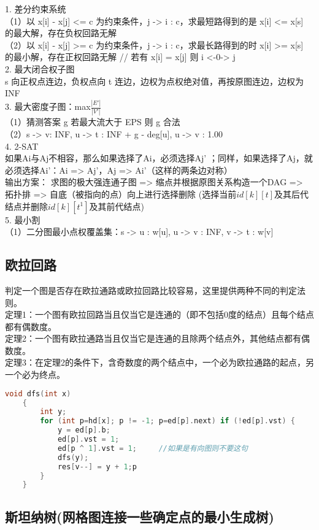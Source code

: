 \documentclass[landscape,a4paper]{article}
\begin{document}
\begin{spacing}{0.3}
\begin{multicols}{2}
		1. 差分约束系统\\
  （1）以 x[i] - x[j] <= c 为约束条件，j -> i : c，求最短路得到的是 x[i] <= x[s] 的最大解，存在负权回路无解\\
  （2）以 x[i] - x[j] >= c 为约束条件，j -> i : c，求最长路得到的时 x[i] >= x[s] 的最小解，存在正权回路无解
  // 若有 x[i] = x[j] 则 i <-0-> j\\
2. 最大闭合权子图\\
  s 向正权点连边，负权点向 t 连边，边权为点权绝对值，再按原图连边，边权为INF\\
3. 最大密度子图：max{$\frac{|E'|}{|V'|}$}\\
  （1）猜测答案 g 若最大流大于 EPS 则 g 合法\\
  （2）s -> v: INF, u -> t : INF + g - deg[u], u -> v : 1.00\\
4. 2-SAT\\
  如果Ai与Aj不相容，那么如果选择了Ai，必须选择Aj' ；同样，如果选择了Aj，就必须选择Ai'：Ai => Aj'，Aj => Ai'（这样的两条边对称）\\
  输出方案：  求图的极大强连通子图 => 缩点并根据原图关系构造一个DAG => 拓扑排 => 自底（被指向的点）向上进行选择删除
(选择当前$id[k][t]$及其后代结点并删除$id[k][t^1]$及其前代结点)\\
5. 最小割\\

（1）二分图最小点权覆盖集：s -> u : w[u], u -> v : INF, v -> t : w[v]\\


\subsection{欧拉回路}
判定一个图是否存在欧拉通路或欧拉回路比较容易，这里提供两种不同的判定法则。\\
定理1：一个图有欧拉回路当且仅当它是连通的（即不包括0度的结点）且每个结点都有偶数度。\\
定理2：一个图有欧拉通路当且仅当它是连通的且除两个结点外，其他结点都有偶数度。 \\
定理3：在定理2的条件下，含奇数度的两个结点中，一个必为欧拉通路的起点，另一个必为终点。
\begin{lstlisting}[language=C++]
	void dfs(int x)
	{
    	int y;
   	 	for (int p=hd[x]; p != -1; p=ed[p].next) if (!ed[p].vst) {
       	 	y = ed[p].b;
        	ed[p].vst = 1;
        	ed[p ^ 1].vst = 1;     //如果是有向图则不要这句
        	dfs(y);
        	res[v--] = y + 1;p
    	}
	}
\end{lstlisting}
		  \subsection{斯坦纳树(网格图连接一些确定点的最小生成树)}
		

\end{multicols}
\end{spacing}
\end{document}
